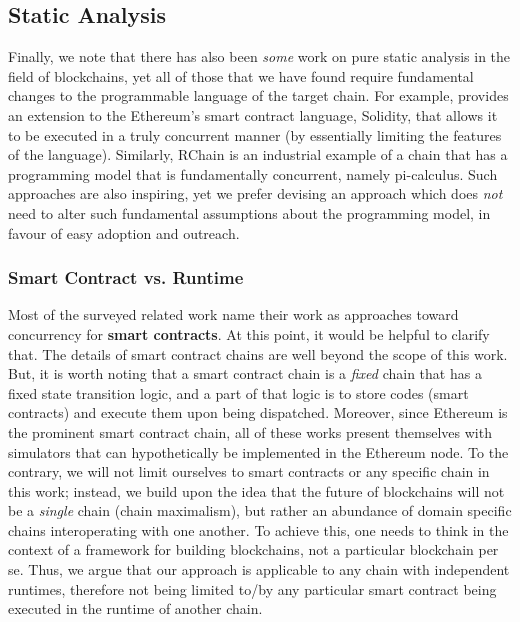 \subsection{Static Analysis}

Finally, we note that there has also been \textit{some} work on pure static analysis in the field of
blockchains, yet all of those that we have found require fundamental changes to the programmable
language of the target chain. For example, \cite{bartolettiTrueConcurrentModel2019} provides an
extension to the Ethereum's smart contract language, Solidity, that allows it to be executed in a
truly concurrent manner (by essentially limiting the features of the language). Similarly, RChain is
an industrial example of a chain that has a programming model that is fundamentally
concurrent\cite{darrylRCast21Currency2019}, namely
pi-calculus\cite{turnerPolymorphicPiCalculusTheory1996}. Such approaches are also inspiring, yet we
prefer devising an approach which does \textit{not} need to alter such fundamental assumptions about
the programming model, in favour of easy adoption and outreach.


\subsubsection{Smart Contract vs. Runtime}


Most of the surveyed related work name their work as approaches toward concurrency for \textbf{smart
contracts}. At this point, it would be helpful to clarify that. The details of smart contract chains
are well beyond the scope of this work. But, it is worth noting that a smart contract chain is a
\textit{fixed} chain that has a fixed state transition logic, and a part of that logic is to store
codes (smart contracts) and execute them upon being dispatched. Moreover, since Ethereum is the
prominent smart contract chain, all of these works present themselves with simulators that can
hypothetically be implemented in the Ethereum node. To the contrary, we will not limit ourselves to
smart contracts or any specific chain in this work; instead, we build upon the idea that the future
of blockchains will not be a \textit{single} chain (chain maximalism), but rather an abundance of
domain specific chains interoperating with one another. To achieve this, one needs to think in the
context of a framework for building blockchains, not a particular blockchain per se. Thus, we argue
that our approach is applicable to any chain with independent runtimes, therefore not being limited
to/by any particular smart contract being executed in the runtime of another chain.

